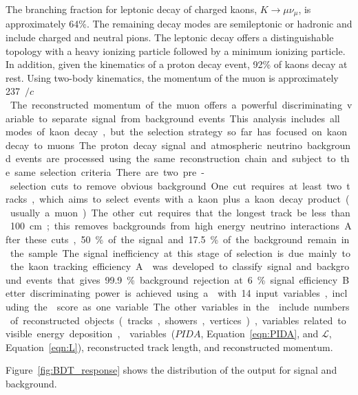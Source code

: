 The branching fraction for leptonic decay of charged kaons, $K\rightarrow \mu \nu_{\mu}$, is approximately \num{64}\%. The remaining decay modes are semileptonic or hadronic and include charged and neutral pions. The leptonic decay offers a distinguishable topology with a heavy ionizing particle followed by a minimum ionizing particle. In addition, given the kinematics of a proton decay event, \num{92}\% of kaons decay at rest. Using two-body kinematics, the momentum of the muon is approximately \SI{237}{\MeV$/c$}. The reconstructed momentum of the muon offers a powerful discriminating variable to separate signal from background events.  This analysis includes all modes of kaon decay, but the selection strategy so far has focused on kaon decay to muons.

The proton decay signal and atmospheric neutrino background events are processed using the same reconstruction chain and subject to the same selection criteria. There are two pre-selection cuts to remove obvious background. One cut requires at least two tracks, which aims to select events with a kaon plus a kaon decay product (usually a muon).  The other cut requires that the longest track be less than \SI{100}{\cm}; this removes backgrounds from high energy neutrino interactions.  After these cuts, \num{50}\% of the signal and \num{17.5}\% of the background remain in the sample.  The signal inefficiency at this stage of selection is due mainly to the kaon tracking efficiency.

A  was developed to classify signal and background events that gives \num{99.9}\% background rejection at \num{6}\% signal efficiency.  Better discriminating power is achieved using a  with \num{14} input variables, including the  score as one  variable.  The other variables in the  include numbers of reconstructed objects (tracks, showers, vertices), variables related to visible energy deposition,  variables ($PIDA$, Equation~\ref{eqn:PIDA}, and $\mathcal{L}$, Equation~\ref{eqn:L}), reconstructed track length, and reconstructed momentum.

Figure~\ref{fig:BDT_response} shows the distribution of the  output for signal and background.


